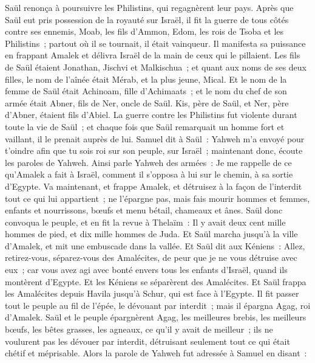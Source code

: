 \begin{multicols}{2}
Saül renonça à poursuivre les Philistins, qui regagnèrent leur pays.
Après que Saül eut pris possession de la royauté sur Israël, il fit la guerre de tous côtés contre ses ennemis, Moab, les fils d'Ammon, Edom, les rois de Tsoba et les Philistins~; partout où il se tournait, il était vainqueur.
Il manifesta sa puissance en frappant Amalek et délivra Israël de la main de ceux qui le pillaient.
Les fils de Saül étaient Jonathan, Jischvi et Malkischua~; et quant aux noms de ses deux filles, le nom de l'aînée était Mérab, et la plus jeune, Mical.
Et le nom de la femme de Saül était Achinoam, fille d'Achimaats~; et le nom du chef de son armée était Abner, fils de Ner, oncle de Saül.
Kis, père de Saül, et Ner, père d'Abner, étaient fils d'Abiel.
La guerre contre les Philistins fut violente durant toute la vie de Saül~; et chaque fois que Saül remarquait un homme fort et vaillant, il le prenait auprès de lui.
\VerseOne{}Samuel dit à Saül~: Yahweh m'a envoyé pour t'oindre afin que tu sois roi sur son peuple, sur Israël~; maintenant donc, écoute les paroles de Yahweh.
Ainsi parle Yahweh des armées~: Je me rappelle de ce qu'Amalek a fait à Israël, comment il s'opposa à lui sur le chemin, à sa sortie d'Egypte.
Va maintenant, et frappe Amalek, et détruisez à la façon de l'interdit tout ce qui lui appartient~; ne l'épargne pas, mais fais mourir hommes et femmes, enfants et nourrissons, bœufs et menu bétail, chameaux et ânes.
Saül donc convoqua le peuple, et en fit la revue à Thelaïm~: Il y avait deux cent mille hommes de pied, et dix mille hommes de Juda.
Et Saül marcha jusqu'à la ville d'Amalek, et mit une embuscade dans la vallée.
Et Saül dit aux Kéniens~: Allez, retirez-vous, séparez-vous des Amalécites, de peur que je ne vous détruise avec eux~; car vous avez agi avec bonté envers tous les enfants d'Israël, quand ils montèrent d'Egypte. Et les Kéniens se séparèrent des Amalécites.
Et Saül frappa les Amalécites depuis Havila jusqu'à Schur, qui est face à l'Egypte.
Il fit passer tout le peuple au fil de l'épée, le dévouant par interdit~; mais il épargna Agag, roi d'Amalek.
Saül et le peuple épargnèrent Agag, les meilleures brebis, les meilleurs bœufs, les bêtes grasses, les agneaux, ce qu'il y avait de meilleur~; ils ne voulurent pas les dévouer par interdit, détruisant seulement tout ce qui était chétif et méprisable.
Alors la parole de Yahweh fut adressée à Samuel en disant~:

\end{multicols}
